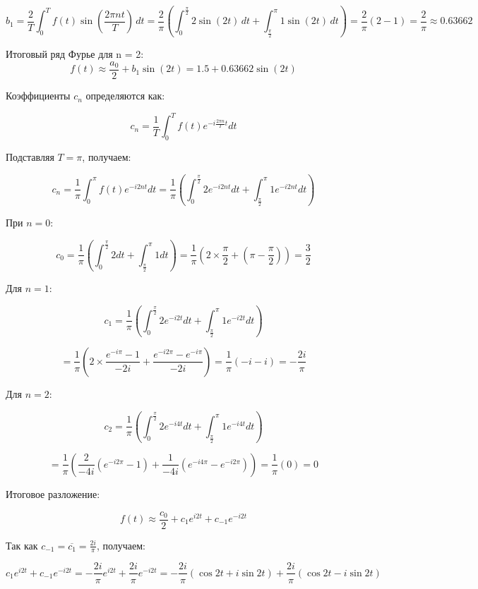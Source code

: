 \documentclass[a4paper,12pt]{article}
\begin{document}
\[
b_1 = \frac{2}{T} \int_{0}^{T} f(t) \sin\left(\frac{2\pi n t}{T}\right) \, dt = \frac{2}{\pi} \left( \int_{0}^{\frac{\pi}{2}} 2 \sin(2t) \, dt + \int_{\frac{\pi}{2}}^{\pi} 1 \sin(2t) \, dt \right) = \frac{2}{\pi} (2 - 1) = \frac{2}{\pi} \approx 0.63662
\]

Итоговый ряд Фурье для n = 2:
\[
f(t) \approx \frac{a_0}{2} + b_1 \sin(2t) = 1.5 + 0.63662 \sin(2t)
\]



Коэффициенты \( c_n \) определяются как:

\[
c_n = \frac{1}{T} \int_{0}^{T} f(t) e^{-i \frac{2\pi n}{T} t} dt
\]

Подставляя \( T = \pi \), получаем:

\[
c_n = \frac{1}{\pi} \int_{0}^{\pi} f(t) e^{-i 2 n t} dt = \frac{1}{\pi} \left( \int_{0}^{\frac{\pi}{2}} 2 e^{-i 2 n t} dt + \int_{\frac{\pi}{2}}^{\pi} 1 e^{-i 2 n t} dt \right)
\]

При \( n = 0 \):

\[
c_0 = \frac{1}{\pi} \left( \int_{0}^{\frac{\pi}{2}} 2 dt + \int_{\frac{\pi}{2}}^{\pi} 1 dt \right) = \frac{1}{\pi} \left( 2 \times \frac{\pi}{2} + (\pi - \frac{\pi}{2}) \right) = \frac{3}{2}
\]

Для \( n = 1 \):

\[
c_1 = \frac{1}{\pi} \left( \int_{0}^{\frac{\pi}{2}} 2 e^{-i 2 t} dt + \int_{\frac{\pi}{2}}^{\pi} 1 e^{-i 2 t} dt \right)
\]

\[
= \frac{1}{\pi} \left( 2 \times \frac{e^{-i \pi} - 1}{-2i} + \frac{e^{-i 2\pi} - e^{-i \pi}}{-2i} \right) = \frac{1}{\pi} \left( -i - i \right) = -\frac{2i}{\pi}
\]

Для \( n = 2 \):

\[
c_2 = \frac{1}{\pi} \left( \int_{0}^{\frac{\pi}{2}} 2 e^{-i 4 t} dt + \int_{\frac{\pi}{2}}^{\pi} 1 e^{-i 4 t} dt \right)
\]

\[
= \frac{1}{\pi} \left( \frac{2}{-4i} (e^{-i 2\pi} - 1) + \frac{1}{-4i} (e^{-i 4\pi} - e^{-i 2\pi}) \right) = \frac{1}{\pi} (0) = 0
\]

Итоговое разложение:

\[
f(t) \approx \frac{c_0}{2} + c_1 e^{i 2t} + c_{-1} e^{-i 2t}
\]

Так как \( c_{-1} = \overline{c_1} = \frac{2i}{\pi} \), получаем:

\[
c_1 e^{i 2t} + c_{-1} e^{-i 2t} = -\frac{2i}{\pi} e^{i 2t} + \frac{2i}{\pi} e^{-i 2t} = -\frac{2i}{\pi} (\cos 2t + i \sin 2t) + \frac{2i}{\pi} (\cos 2t - i \sin 2t)
\]
\end{document}
